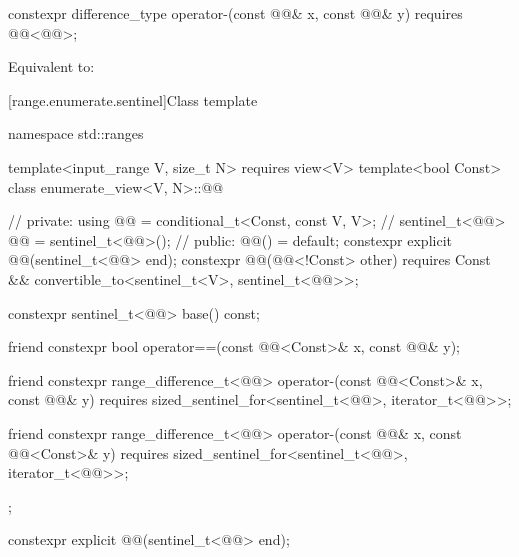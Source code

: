 \documentclass{wg21}
\begin{document}
\begin{itemdecl}
    constexpr difference_type operator-(const @@& x, const @@& y)
    requires @@<@@>;
\end{itemdecl}

\begin{itemdescr}
    \pnum
    \effects
    Equivalent to: 
\end{itemdescr}


[range.enumerate.sentinel]{Class template }

\begin{codeblock}
namespace std::ranges {
    template<input_range V, size_t N>
    requires view<V>
    template<bool Const>
    class enumerate_view<V, N>::@@ {                 // \expos
        private:
        using @@ = conditional_t<Const, const V, V>;      // \expos
        sentinel_t<@@> @@ = sentinel_t<@@>();         // \expos
        public:
        @@() = default;
        constexpr explicit @@(sentinel_t<@@> end);
        constexpr @@(@@<!Const> other)
        requires Const && convertible_to<sentinel_t<V>, sentinel_t<@@>>;
        
        constexpr sentinel_t<@@> base() const;
        
        friend constexpr bool operator==(const @@<Const>& x, const @@& y);
        
        friend constexpr range_difference_t<@@>
        operator-(const @@<Const>& x, const @@& y)
        requires sized_sentinel_for<sentinel_t<@@>, iterator_t<@@>>;
        
        friend constexpr range_difference_t<@@>
        operator-(const @@& x, const @@<Const>& y)
        requires sized_sentinel_for<sentinel_t<@@>, iterator_t<@@>>;
    };
}
\end{codeblock}

\begin{itemdecl}
    constexpr explicit @@(sentinel_t<@@> end);
\end{itemdecl}
\end{document}
